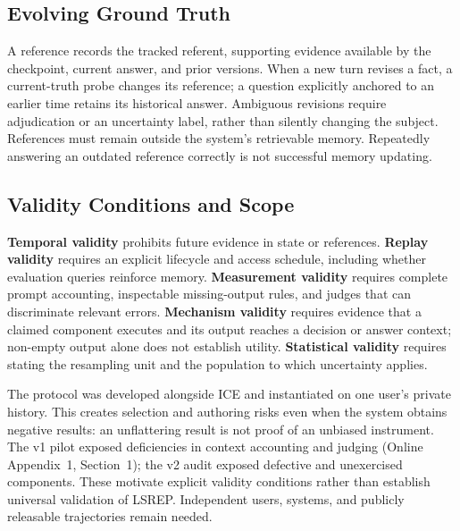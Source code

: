 \documentclass[twoside,11pt]{article}
\begin{document}
\subsection{Evolving Ground Truth}
A reference records the tracked referent, supporting evidence available by the checkpoint, current answer, and prior versions. When a new turn revises a fact, a current-truth probe changes its reference; a question explicitly anchored to an earlier time retains its historical answer. Ambiguous revisions require adjudication or an uncertainty label, rather than silently changing the subject. References must remain outside the system's retrievable memory. Repeatedly answering an outdated reference correctly is not successful memory updating.

\subsection{Validity Conditions and Scope}
\label{sec:lsrep-standing}
\textbf{Temporal validity} prohibits future evidence in state or references. \textbf{Replay validity} requires an explicit lifecycle and access schedule, including whether evaluation queries reinforce memory. \textbf{Measurement validity} requires complete prompt accounting, inspectable missing-output rules, and judges that can discriminate relevant errors. \textbf{Mechanism validity} requires evidence that a claimed component executes and its output reaches a decision or answer context; non-empty output alone does not establish utility. \textbf{Statistical validity} requires stating the resampling unit and the population to which uncertainty applies.

The protocol was developed alongside ICE and instantiated on one user's private history. This creates selection and authoring risks even when the system obtains negative results: an unflattering result is not proof of an unbiased instrument. The v1 pilot exposed deficiencies in context accounting and judging (Online Appendix~1, Section~1); the v2 audit exposed defective and unexercised components. These motivate explicit validity conditions rather than establish universal validation of LSREP. Independent users, systems, and publicly releasable trajectories remain needed.
\end{document}
